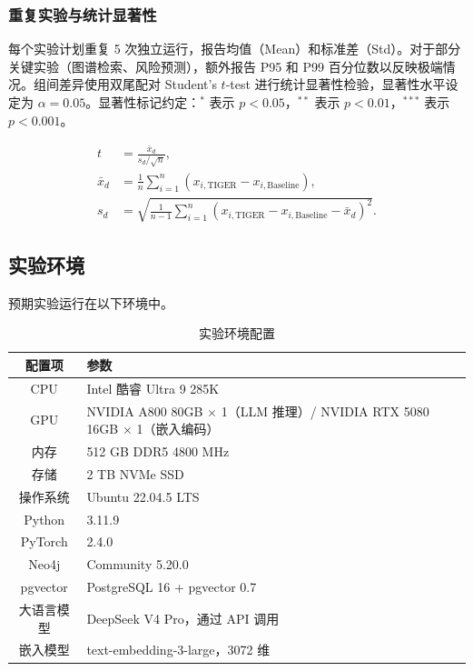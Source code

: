 \documentclass[12pt,a4paper]{article}
\begin{document}
\subsubsection{重复实验与统计显著性}

每个实验计划重复 5 次独立运行，报告均值（Mean）和标准差（Std）。对于部分关键实验（图谱检索、风险预测），额外报告 P95 和 P99 百分位数以反映极端情况。组间差异使用双尾配对 Student's $t$-test 进行统计显著性检验，显著性水平设定为 $\alpha=0.05$。显著性标记约定：$^{\ast}$ 表示 $p < 0.05$，$^{\ast\ast}$ 表示 $p < 0.01$，$^{\ast\ast\ast}$ 表示 $p < 0.001$。

\begin{align}
t &= \frac{\bar{x}_d}{s_d / \sqrt{n}}, \\[0.3em]
\bar{x}_d &= \frac{1}{n}\sum_{i=1}^{n}(x_{i,\text{TIGER}} - x_{i,\text{Baseline}}), \\[0.3em]
s_d &= \sqrt{\frac{1}{n-1}\sum_{i=1}^{n}(x_{i,\text{TIGER}} - x_{i,\text{Baseline}} - \bar{x}_d)^2}.
\end{align}

\subsection{实验环境}
\label{sec:exp-env}

预期实验运行在以下环境中。

\begin{table}[H]
\centering
\footnotesize
\caption{实验环境配置}
\label{tab:exp-env}
\begin{tabularx}{0.95\linewidth}{c X}
\toprule
\textbf{配置项} & \textbf{参数} \\
\midrule
CPU & Intel 酷睿 Ultra 9 285K \\
GPU & NVIDIA A800 80GB $\times$ 1（LLM 推理）/ NVIDIA RTX 5080 16GB $\times$ 1（嵌入编码） \\
内存 & 512 GB DDR5 4800 MHz \\
存储 & 2 TB NVMe SSD \\
操作系统 & Ubuntu 22.04.5 LTS \\
Python & 3.11.9 \\
PyTorch & 2.4.0 \\
Neo4j & Community 5.20.0 \\
pgvector & PostgreSQL 16 + pgvector 0.7 \\
大语言模型 & DeepSeek V4 Pro，通过 API 调用 \\
嵌入模型 & text-embedding-3-large，3072 维 \\
\bottomrule
\end{tabularx}
\end{table}
\end{document}
